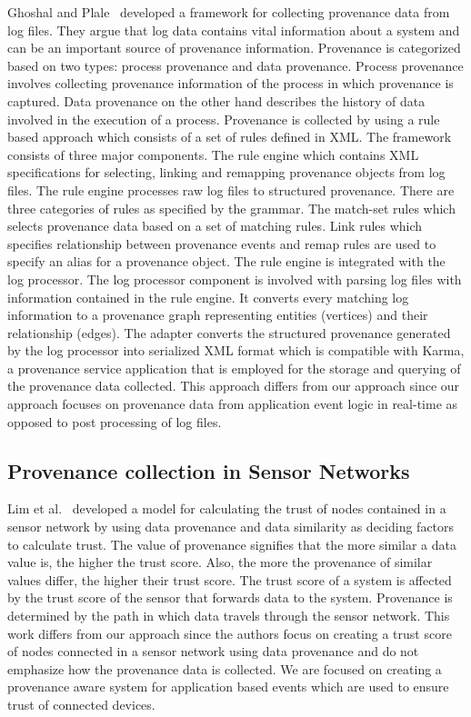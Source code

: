 Ghoshal and Plale~\cite{ghoshal_provenance_2013} developed a framework for collecting provenance data from log files. They argue that log data contains vital information about a system and can be an important source of provenance information. Provenance is categorized based on two types: process provenance and data provenance. Process provenance involves collecting provenance information of the process in which provenance is captured. Data provenance on the other hand describes the history of data involved in the execution of a process. Provenance is collected by using a rule based approach which consists of a set of rules defined in XML. The framework consists of three major components. The rule engine which contains XML specifications for selecting, linking and remapping provenance objects from log files. The rule engine processes raw log files to structured provenance. There are three categories of rules as specified by the grammar. The match-set rules which selects provenance data based on a set of matching rules. Link rules which specifies relationship between provenance events and remap rules are used to specify an alias for a provenance object. The rule engine is integrated with the log processor. The log processor component is involved with parsing log files with information contained in the rule engine. It converts every matching log information to a provenance graph representing entities (vertices) and their relationship (edges). The adapter converts the structured provenance generated by the log processor into serialized XML format which is compatible with Karma, a provenance service application that is employed for the storage and querying of the provenance data collected. This approach differs from our approach since our approach focuses on provenance data from application event logic in real-time as opposed to post processing of log files.

\subsection{Provenance collection in Sensor Networks}
Lim et al.~\cite{lim} developed a
model for calculating the trust of nodes contained in a sensor network by using data
provenance and data similarity as deciding factors to calculate trust. The value of
provenance signifies that the more similar a data value is, the higher the trust score.
Also, the more the provenance of similar values differ, the higher their trust score. The trust score of a system is affected by the trust score of the sensor that forwards data to the system. Provenance is determined by the path in which data travels through the sensor network. This work differs from our approach since the authors focus on creating a trust score
of nodes connected in a sensor network using data provenance and do not emphasize
how the provenance data is collected. We are focused on creating a
provenance aware system for application based events which are used to ensure trust of
connected devices. 

